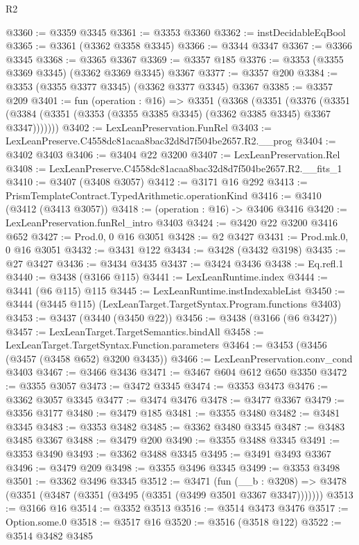 \begin{lexlean}{R2}
\begin{coremodule}
@3360 := @3359 @3345
@3361 := @3353 @3360
@3362 := instDecidableEqBool
@3365 := @3361 (@3362 @3358 @3345)
@3366 := @3344 @3347
@3367 := @3366 @3345
@3368 := @3365 @3367
@3369 := @3357 @185
@3376 := @3353 (@3355 @3369 @3345) (@3362 @3369 @3345) @3367
@3377 := @3357 @200
@3384 := @3353 (@3355 @3377 @3345) (@3362 @3377 @3345) @3367
@3385 := @3357 @209
@3401 := fun (operation : @16) =>
  @3351
    (@3368
      (@3351
        (@3376
          (@3351 (@3384 (@3351 (@3353 (@3355 @3385 @3345) (@3362 @3385 @3345) @3367 @3347)))))))
@3402 := LexLeanPreservation.FunRel
@3403 := LexLeanPreserve.C4558dc81acaa8bac32d8d7f504be2657.R2.__prog
@3404 := @3402 @3403
@3406 := @3404 @22 @3200
@3407 := LexLeanPreservation.Rel
@3408 := LexLeanPreserve.C4558dc81acaa8bac32d8d7f504be2657.R2.__fits_1
@3410 := @3407 (@3408 @3057)
@3412 := @3171 @16 @292
@3413 := PrismTemplateContract.TypedArithmetic.operationKind
@3416 := @3410 (@3412 (@3413 @3057))
@3418 := (operation : @16) -> @3406 @3416
@3420 := LexLeanPreservation.funRel_intro @3403
@3424 := @3420 @22 @3200 @3416 @652
@3427 := Prod.{0, 0} @16 @3051
@3428 := @2 @3427
@3431 := Prod.mk.{0, 0} @16 @3051
@3432 := @3431 @122
@3434 := @3428 (@3432 @3198)
@3435 := @27 @3427
@3436 := @3434 @3435
@3437 := @3424 @3436
@3438 := Eq.refl.{1}
@3440 := @3438 (@3166 @115)
@3441 := LexLeanRuntime.index
@3444 := @3441 (@6 @115) @115
@3445 := LexLeanRuntime.instIndexableList
@3450 := @3444 (@3445 @115) (LexLeanTarget.TargetSyntax.Program.functions @3403)
@3453 := @3437 (@3440 (@3450 @22))
@3456 := @3438 (@3166 (@6 @3427))
@3457 := LexLeanTarget.TargetSemantics.bindAll
@3458 := LexLeanTarget.TargetSyntax.Function.parameters
@3464 := @3453 (@3456 (@3457 (@3458 @652) @3200 @3435))
@3466 := LexLeanPreservation.conv_cond @3403
@3467 := @3466 @3436
@3471 := @3467 @604 @612 @650 @3350
@3472 := @3355 @3057
@3473 := @3472 @3345
@3474 := @3353 @3473
@3476 := @3362 @3057 @3345
@3477 := @3474 @3476
@3478 := @3477 @3367
@3479 := @3356 @3177
@3480 := @3479 @185
@3481 := @3355 @3480
@3482 := @3481 @3345
@3483 := @3353 @3482
@3485 := @3362 @3480 @3345
@3487 := @3483 @3485 @3367
@3488 := @3479 @200
@3490 := @3355 @3488 @3345
@3491 := @3353 @3490
@3493 := @3362 @3488 @3345
@3495 := @3491 @3493 @3367
@3496 := @3479 @209
@3498 := @3355 @3496 @3345
@3499 := @3353 @3498
@3501 := @3362 @3496 @3345
@3512 := @3471
    (fun (__b : @3208) => @3478 (@3351 (@3487 (@3351 (@3495 (@3351 (@3499 @3501 @3367 @3347)))))))
@3513 := @3166 @16
@3514 := @3352 @3513
@3516 := @3514 @3473 @3476
@3517 := Option.some.{0}
@3518 := @3517 @16
@3520 := @3516 (@3518 @122)
@3522 := @3514 @3482 @3485

\end{coremodule}
\end{lexlean}
